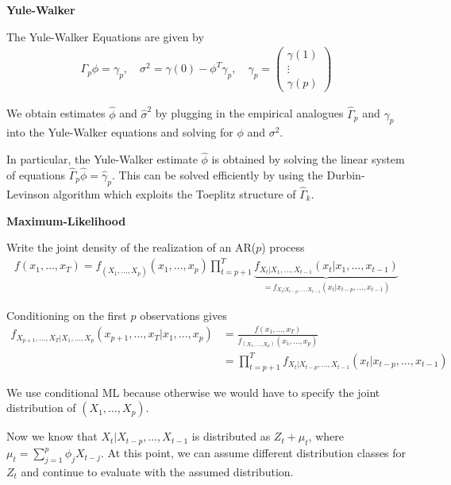 \textbf{Yule-Walker}

The Yule-Walker Equations are given by
\begin{align*}
    \Gamma_p\phi=\gamma_p,\quad\sigma^2=\gamma(0)-\phi^{T}\gamma_p,\quad\gamma_p=\begin{pmatrix}
        \gamma(1)\\
        \vdots\\
        \gamma(p)
    \end{pmatrix}
\end{align*}

We obtain estimates $\hat{\phi}$ and $\hat{\sigma}^2$ by plugging in the empirical analogues $\hat{\Gamma}_p$ and $\hat{\gamma}_p$ into the Yule-Walker equations and solving for $\phi$ and $\sigma^2$. 

In particular, the Yule-Walker estimate $\hat{\phi}$ is obtained by solving the linear system of equations $\hat{\Gamma}_p\hat{\phi}=\hat{\gamma}_p$. This can be solved efficiently by using the Durbin-Levinson algorithm which exploits the Toeplitz structure of $\hat{\Gamma}_k$.

\textbf{Maximum-Likelihood}

Write the joint density of the realization of an AR($p$) process
\begin{align*}
    f(x_1,\dots,x_T)=f_{(X_1,\dots,X_p)}(x_1,\dots,x_p)\prod_{t=p+1}^{T}\underbrace{f_{X_t|X_1,\dots,X_{t-1}}(x_t|x_1,\dots,x_{t-1})}_{=f_{X_t|X_{t-p},\dots,X_{t-1}}(x_t|x_{t-p},\dots,x_{t-1})}
\end{align*}

Conditioning on the first $p$ observations gives
\begin{equation}\label{eq:cond_max_likelihood}
    \begin{aligned}
        f_{X_{p+1},\dots,X_T|X_1,\dots,X_p}(x_{p+1},\dots,x_T|x_1,\dots,x_p)&=\frac{f(x_1,\dots,x_T)}{f_{(X_1,\dots,X_p)}(x_1,\dots,x_p)}\\&
        =\prod_{t=p+1}^{T}f_{X_t|X_{t-p},\dots,X_{t-1}}(x_t|x_{t-p},\dots,x_{t-1})
    \end{aligned}
\end{equation}

We use conditional ML because otherwise we would have to specify the joint distribution of $(X_1,\dots,X_p)$.

Now we know that $X_t|X_{t-p},\dots,X_{t-1}$ is distributed as $Z_t+\mu_t$, where $\mu_t=\sum_{j=1}^{p}\phi_jX_{t-j}$. At this point, we can assume different distribution classes for $Z_t$ and continue to evaluate with the assumed distribution.

